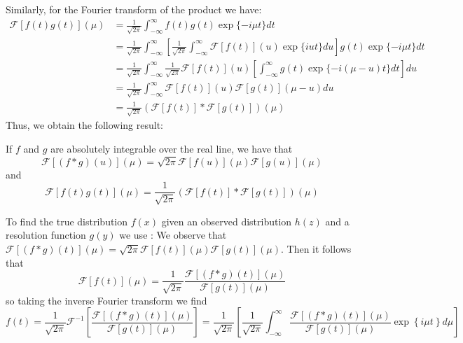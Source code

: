 \documentclass[12pt, a4paper, oneside, openright, titlepage]{book}
\begin{document}
Similarly, for the Fourier transform of the product we have: \begin{align*}
    \mathcal{F}[f(t)g(t)](\mu) &= \frac{1}{\sqrt{2\pi}}\int_{-\infty}^{\infty}f(t)g(t)\exp\{-i\mu t\}dt \\
    &= \frac{1}{\sqrt{2\pi}}\int_{-\infty}^{\infty}\left[\frac{1}{\sqrt{2\pi}}\int_{-\infty}^{\infty}\mathcal{F}[f(t)](u)\exp\{iut\}du\right]g(t)\exp\{-i\mu t\}dt \\
    &= \frac{1}{\sqrt{2\pi}}\int_{-\infty}^{\infty}\frac{1}{\sqrt{2\pi}}\mathcal{F}[f(t)](u)\left[\int_{-\infty}^{\infty}g(t)\exp\{-i(\mu-u)t\}dt\right]du \\
    &= \frac{1}{\sqrt{2\pi}}\int_{-\infty}^{\infty}\mathcal{F}[f(t)](u)\mathcal{F}[g(t)](\mu-u)du \\
    &= \frac{1}{\sqrt{2\pi}}(\mathcal{F}[f(t)]*\mathcal{F}[g(t)])(\mu)
\end{align*}
Thus, we obtain the following result: 

\begin{thm}
    If $f$ and $g$ are absolutely integrable over the real line, we have that \begin{equation}
        \boxed{\mathcal{F}[(f*g)(u)](\mu) = \sqrt{2\pi}\mathcal{F}[f(u)](\mu)\mathcal{F}[g(u)](\mu)}
    \end{equation}
    and \begin{equation}
        \boxed{\mathcal{F}[f(t)g(t)](\mu) = \frac{1}{\sqrt{2\pi}}(\mathcal{F}[f(t)]*\mathcal{F}[g(t)])(\mu)}
    \end{equation}
\end{thm}

To find the true distribution $f(x)$ given an observed distribution $h(z)$ and a resolution function $g(y)$ we use : We observe that $\mathcal{F}[(f*g)(t)](\mu) = \sqrt{2\pi}\mathcal{F}[f(t)](\mu)\mathcal{F}[g(t)](\mu)$. Then it follows that \begin{equation*}
    \mathcal{F}[f(t)](\mu) = \frac{1}{\sqrt{2\pi}}\frac{\mathcal{F}[(f*g)(t)](\mu)}{\mathcal{F}[g(t)](\mu)}
\end{equation*}
so taking the inverse Fourier transform we find \begin{equation}
    f(t) = \frac{1}{\sqrt{2\pi}}\mathcal{F}^{-1}\left[\frac{\mathcal{F}[(f*g)(t)](\mu)}{\mathcal{F}[g(t)](\mu)}\right] = \frac{1}{\sqrt{2\pi}}\left[\frac{1}{\sqrt{2\pi}}\int_{-\infty}^{\infty}\frac{\mathcal{F}[(f*g)(t)](\mu)}{\mathcal{F}[g(t)](\mu)}\exp\left\{i\mu t\right\}d\mu\right]
\end{equation}
\end{document}
